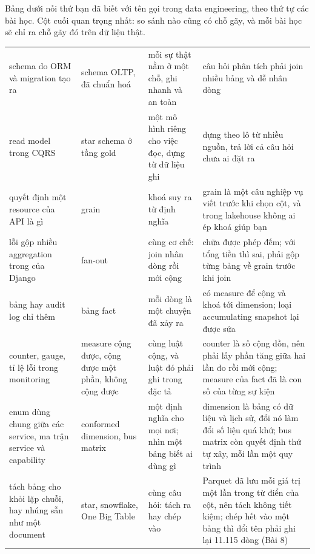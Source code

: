 Bảng dưới nối thứ bạn đã biết với tên gọi trong data engineering, theo thứ tự các bài học. Cột cuối quan trọng nhất: so sánh nào cũng có chỗ gãy, và mỗi bài học sẽ chỉ ra chỗ gãy đó trên dữ liệu thật.

\begin{xltabular}{\textwidth}{@{}P{3.2cm} P{2.8cm} L L@{}}
\toprule
{} &  &  &  \\
\midrule
\endhead
\bottomrule
\endfoot
schema do ORM và migration tạo ra & schema OLTP, đã chuẩn hoá & mỗi sự thật nằm ở một chỗ, ghi nhanh và an toàn & câu hỏi phân tích phải join nhiều bảng và dễ nhân dòng \\
read model trong CQRS & star schema ở tầng gold & một mô hình riêng cho việc đọc, dựng từ dữ liệu ghi & dựng theo lô từ nhiều nguồn, trả lời cả câu hỏi chưa ai đặt ra \\
quyết định một resource của API là gì & grain & khoá suy ra từ định nghĩa & grain là một câu nghiệp vụ viết trước khi chọn cột, và trong lakehouse không ai ép khoá giúp bạn \\
lỗi gộp nhiều aggregation trong  của Django & fan-out & cùng cơ chế: join nhân dòng rồi mới cộng &  chữa được phép đếm; với tổng tiền thì  sai, phải gộp từng bảng về grain trước khi join \\
bảng  hay audit log chỉ thêm & bảng fact & mỗi dòng là một chuyện đã xảy ra & có measure để cộng và khoá tới dimension; loại accumulating snapshot lại được sửa \\
counter, gauge, tỉ lệ lỗi trong monitoring & measure cộng được, cộng được một phần, không cộng được & cùng luật cộng, và luật đó phải ghi trong đặc tả & counter là số cộng dồn, nên phải lấy phần tăng giữa hai lần đo rồi mới cộng; measure của fact đã là con số của từng sự kiện \\
enum dùng chung giữa các service, ma trận service và capability & conformed dimension, bus matrix & một định nghĩa cho mọi nơi; nhìn một bảng biết ai dùng gì & dimension là bảng có dữ liệu và lịch sử, đổi nó làm đổi số liệu quá khứ; bus matrix còn quyết định thứ tự xây, mỗi lần một quy trình \\
tách bảng cho khỏi lặp chuỗi, hay nhúng sẵn như một document & star, snowflake, One Big Table & cùng câu hỏi: tách ra hay chép vào & Parquet đã lưu mỗi giá trị một lần trong từ điển của cột, nên tách không tiết kiệm; chép hết vào một bảng thì đổi tên  phải ghi lại 11.115 dòng (Bài 8) \\

\end{xltabular}
